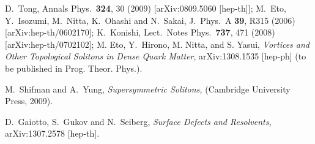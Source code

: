 \documentclass[12pt]{article}
\begin{document}
\small
\begin{thebibliography}{99}
\itemsep -2pt

  D.~Tong,
  Annals Phys.\  {\bf 324}, 30 (2009)
  [arXiv:0809.5060 [hep-th]];
  M.~Eto, Y.~Isozumi, M.~Nitta, K.~Ohashi and N.~Sakai,
  J.\ Phys.\ A  {\bf 39}, R315 (2006)
  [arXiv:hep-th/0602170];
  K.~Konishi,
  Lect.\ Notes Phys.\  {\bf 737}, 471 (2008)
  [arXiv:hep-th/0702102];
  M. Eto, Y.~Hirono, M.  Nitta, and S. Yasui,
  {\em Vortices and Other Topological Solitons in Dense Quark Matter},
  arXiv:1308.1535 [hep-ph] (to be published in Prog. Theor. Phys.).

  M.~Shifman and A.~Yung,
  {\em Supersymmetric Solitons,}
  (Cambridge University Press, 2009).
  
  D.~Gaiotto, S.~Gukov and N.~Seiberg,
  {\em Surface Defects and Resolvents,}
  arXiv:1307.2578 [hep-th].


\end{thebibliography}
\end{document}
